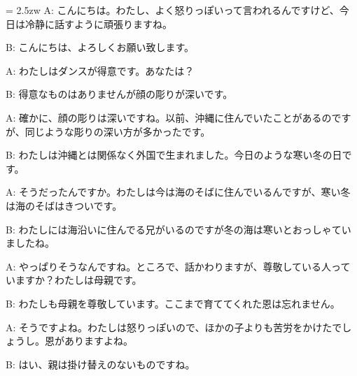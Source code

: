 \documentclass[11pt]{amsart}
\title{}
\author{}
\newenvironment{hangall}[1]{\hangindent = 2.5zw\everypar{\hangindent = 2.5zw}}{}
\begin{document}
\maketitle
\begin{hangall}{}%
A: こんにちは。わたし、よく怒りっぽいって言われるんですけど、今日は冷静に話すように頑張りますね。

B: こんにちは、よろしくお願い致します。

A: わたしはダンスが得意です。あなたは？

B: 得意なものはありませんが顔の彫りが深いです。

A: 確かに、顔の彫りは深いですね。以前、沖縄に住んでいたことがあるのですが、同じような彫りの深い方が多かったです。

B: わたしは沖縄とは関係なく外国で生まれました。今日のような寒い冬の日です。

A: そうだったんですか。わたしは今は海のそばに住んでいるんですが、寒い冬は海のそばはきついです。

B: わたしには海沿いに住んでる兄がいるのですが冬の海は寒いとおっしゃていましたね。

A: やっぱりそうなんですね。ところで、話かわりますが、尊敬している人っていますか？わたしは母親です。

B: わたしも母親を尊敬しています。ここまで育ててくれた恩は忘れません。

A: そうですよね。わたしは怒りっぽいので、ほかの子よりも苦労をかけたでしょうし。恩がありますよね。

B: はい、親は掛け替えのないものですね。
\end{hangall}
\end{document}
